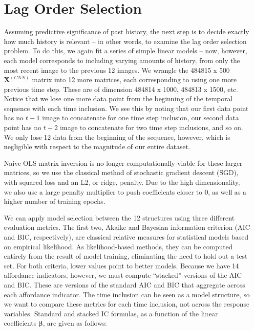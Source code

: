 \documentclass[master]{subfiles}
\begin{document}
\section{Lag Order Selection}\label{sec:lag_order}
Assuming predictive significance of past history, the next step is to decide exactly how much history is relevant -- in other words, to examine the lag order selection problem.  To do this, we again fit a series of simple linear models -- now, however, each model corresponds to including varying amounts of history, from only the most recent image to the previous 12 images.  We wrangle the 484815 x 500 $\mathbf{X}^{(CNN)}$ matrix into 12 more matrices, each corresponding to using one more previous time step.  These are of dimension 484814 x 1000, 484813 x 1500, etc.  Notice that we lose one more data point from the beginning of the temporal sequence with each time inclusion.  We see this by noting that our first data point has no $t-1$ image to concatenate for one time step inclusion, our second data point has no $t-2$ image to concatenate for two time step inclusions, and so on.  We only lose 12 data from the beginning of the sequence, however, which is negligible with respect to the magnitude of our entire dataset.\par
Naive OLS matrix inversion is no longer computationally viable for these larger matrices, so we use the classical method of stochastic gradient descent (SGD), with squared loss and an L2, or ridge, penalty.  Due to the high dimensionality, we also use a large penalty multiplier to push coefficients closer to 0, as well as a higher number of training epochs.\par
We can apply model selection between the 12 structures using three different evaluation metrics.  The first two, Akaike and Bayesian information criterion (AIC and BIC, respectively), are classical relative measures for statistical models based on empirical likelihood.  As likelihood-based methods, they can be computed entirely from the result of model training, eliminating the need to hold out a test set.  For both criteria, lower values point to better models.  Because we have 14 affordance indicators, however, we must compute ``stacked'' versions of the AIC and BIC.  These are versions of the standard AIC and BIC that aggregate across each affordance indicator.  The time inclusion can be seen as a model structure, so we want to compare these metrics for each time inclusion, not across the response variables.  Standard and stacked IC formulas, as a function of the linear coefficients $\boldsymbol{\beta}$, are given as follows:
\end{document}
